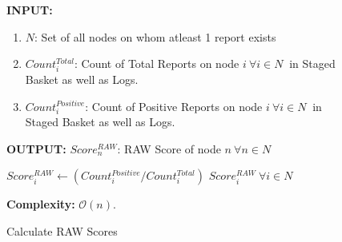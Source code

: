 \documentclass[journal]{IEEEtran}
\makeatletter
\newcommand{\removelatexerror}{\let\@latex@error\@gobble}
\makeatother
\begin{document}
\begin{figure}[!t]\removelatexerror
	\label{fig:ALG_rawSCalc}
\begin{algorithm}[H]
	\caption{Calculate RAW Scores}  
	\label{algo:rawSCalc} 
	\textbf{INPUT:} 
	\begin{enumerate}
		\item $N$: Set of all nodes on whom atleast 1 report exists
		\item $Count^{Total}_{i}$: Count of Total Reports on node $ i\ \forall i\in N\ $ in Staged Basket as well as Logs.
		\item $Count^{Positive}_{i}$: Count of Positive Reports on node $ i\ \forall i\in N\ $ in Staged Basket as well as Logs.
	\end{enumerate}
	\textbf{OUTPUT:}  $Score^{RAW}_n$: RAW Score of node $n\ \forall n\in N$
	\begin{algorithmic}[1]
		\STATE $ Score^{RAW}_i \leftarrow ({Count^{Positive}_i}/{Count^{Total}_i}) $
		\ENDFOR
		\RETURN $Score^{RAW}_i\ \forall i\in N$
	\end{algorithmic}
	\textbf{Complexity:} $\mathcal{O}(n)$.
\end{algorithm}
\end{figure}
\end{document}
